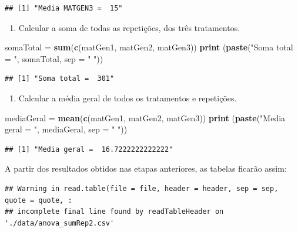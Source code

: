 \documentclass[
]{article}
\newenvironment{Shaded}{\begin{snugshade}}{\end{snugshade}}
\newcommand{\DataTypeTok}[1]{\textcolor[rgb]{0.13,0.29,0.53}{#1}}
\newcommand{\KeywordTok}[1]{\textcolor[rgb]{0.13,0.29,0.53}{\textbf{#1}}}
\newcommand{\NormalTok}[1]{#1}
\newcommand{\StringTok}[1]{\textcolor[rgb]{0.31,0.60,0.02}{#1}}
\providecommand{\tightlist}{%
  \setlength{\itemsep}{0pt}\setlength{\parskip}{0pt}}
\begin{document}
\begin{verbatim}
## [1] "Media MATGEN3 =  15"
\end{verbatim}

\begin{enumerate}
\def\labelenumi{\arabic{enumi}.}
\setcounter{enumi}{7}
\tightlist
\item
  Calcular a soma de todas as repetições, dos três tratamentos.
\end{enumerate}

\begin{Shaded}
\begin{Highlighting}[]
\NormalTok{somaTotal =}\StringTok{ }\KeywordTok{sum}\NormalTok{(}\KeywordTok{c}\NormalTok{(matGen1, matGen2, matGen3))}
\KeywordTok{print}\NormalTok{ (}\KeywordTok{paste}\NormalTok{(}\StringTok{"Soma total = "}\NormalTok{, somaTotal, }\DataTypeTok{sep =} \StringTok{" "}\NormalTok{))}
\end{Highlighting}
\end{Shaded}

\begin{verbatim}
## [1] "Soma total =  301"
\end{verbatim}

\begin{enumerate}
\def\labelenumi{\arabic{enumi}.}
\setcounter{enumi}{8}
\tightlist
\item
  Calcular a média geral de todos os tratamentos e repetições.
\end{enumerate}

\begin{Shaded}
\begin{Highlighting}[]
\NormalTok{mediaGeral =}\StringTok{ }\KeywordTok{mean}\NormalTok{(}\KeywordTok{c}\NormalTok{(matGen1, matGen2, matGen3))}
\KeywordTok{print}\NormalTok{ (}\KeywordTok{paste}\NormalTok{(}\StringTok{"Media geral = "}\NormalTok{, mediaGeral, }\DataTypeTok{sep =} \StringTok{" "}\NormalTok{))}
\end{Highlighting}
\end{Shaded}

\begin{verbatim}
## [1] "Media geral =  16.7222222222222"
\end{verbatim}

A partir dos resultados obtidos nas etapas anteriores, as tabelas ficarão assim:

\begin{verbatim}
## Warning in read.table(file = file, header = header, sep = sep, quote = quote, :
## incomplete final line found by readTableHeader on './data/anova_sumRep2.csv'
\end{verbatim}
\end{document}
